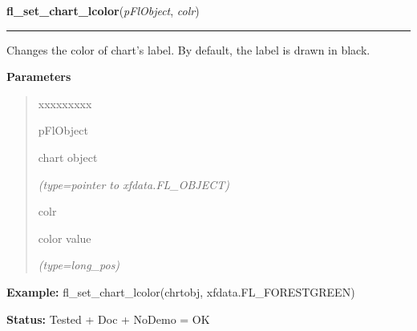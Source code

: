 \hspace{.8\funcindent}\begin{boxedminipage}{\funcwidth}

    \raggedright \textbf{fl\_set\_chart\_lcolor}(\textit{pFlObject}, \textit{colr})

    \vspace{-1.5ex}

    \rule{\textwidth}{0.5\fboxrule}
\setlength{\parskip}{2ex}
    Changes the color of chart's label. By default, the label is drawn in 
    black.

\setlength{\parskip}{1ex}
      \textbf{Parameters}
      \vspace{-1ex}

      \begin{quote}
        \begin{Ventry}{xxxxxxxxx}

          \item[pFlObject]

          chart object

            {\it (type=pointer to xfdata.FL\_OBJECT)}

          \item[colr]

          color value

            {\it (type=long\_pos)}

        \end{Ventry}

      \end{quote}

\textbf{Example:} fl\_set\_chart\_lcolor(chrtobj, xfdata.FL\_FORESTGREEN)



\textbf{Status:} Tested + Doc + NoDemo = OK



    \end{boxedminipage}

    \label{xformslib:flchart:fl_set_chart_baseline}

    \vspace{0.5ex}

